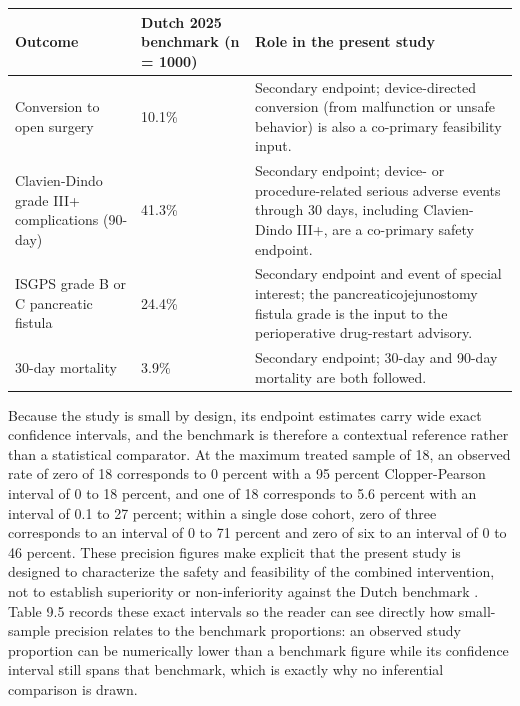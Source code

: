 \noindent\begin{tabularx}{\textwidth}{L{4.3cm} C{4cm} Y}
\toprule
\textbf{Outcome} & \textbf{Dutch 2025 benchmark (n = 1000)} & \textbf{Role in the present study} \\
\midrule
Conversion to open surgery & 10.1\% & Secondary endpoint; device-directed conversion (from malfunction or unsafe behavior) is also a co-primary feasibility input. \\
Clavien-Dindo grade III+ complications (90-day) & 41.3\% & Secondary endpoint; device- or procedure-related serious adverse events through 30 days, including Clavien-Dindo III+, are a co-primary safety endpoint. \\
ISGPS grade B or C pancreatic fistula & 24.4\% & Secondary endpoint and event of special interest; the pancreaticojejunostomy fistula grade is the input to the perioperative drug-restart advisory. \\
30-day mortality & 3.9\% & Secondary endpoint; 30-day and 90-day mortality are both followed. \\
\bottomrule
\end{tabularx}
\vspace*{-0.3cm}

Because the study is small by design, its endpoint estimates carry wide exact
confidence intervals, and the benchmark is therefore a contextual reference rather
than a statistical comparator. At the maximum treated sample of 18, an observed
rate of zero of 18 corresponds to 0 percent with a 95 percent Clopper-Pearson
interval of 0 to 18 percent, and one of 18 corresponds to 5.6 percent with an
interval of 0.1 to 27 percent; within a single dose cohort, zero of three
corresponds to an interval of 0 to 71 percent and zero of six to an interval of 0
to 46 percent. These precision figures make explicit that the present study is
designed to characterize the safety and feasibility of the combined intervention,
not to establish superiority or non-inferiority against the Dutch benchmark
\cite{phase1guidance}. Table 9.5 records these exact intervals so the reader can
see directly how small-sample precision relates to the benchmark proportions: an
observed study proportion can be numerically lower than a benchmark figure while
its confidence interval still spans that benchmark, which is exactly why no
inferential comparison is drawn.

